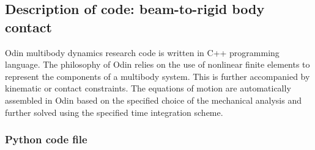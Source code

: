 \subsection{Description of code: beam-to-rigid body contact}
Odin multibody dynamics research code \cite{odin2022} is written in C++ programming language. The philosophy of Odin relies on the use of nonlinear finite elements to represent the components of a multibody system. This is further accompanied by kinematic or contact constraints. The equations of motion are automatically assembled in Odin based on the specified choice of the mechanical analysis and further solved using the specified time integration scheme.\\

\subsubsection{Python code file} 

